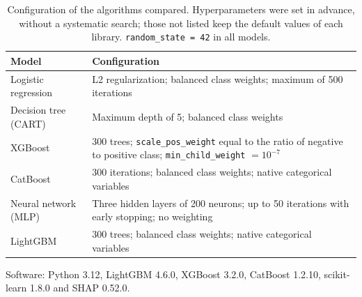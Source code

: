 \documentclass[11pt]{article}
\begin{document}
\begin{table}[h]
\caption{Configuration of the algorithms compared. Hyperparameters were set in advance, without a systematic search;
those not listed keep the default values of each library. \texttt{random\_state = 42} in all models.}
\small
\begin{tabularx}{\linewidth}{@{}p{3.4cm}L@{}}
\toprule
Model & Configuration \\
\midrule
Logistic regression & L2 regularization; balanced class weights; maximum of 500 iterations \\
Decision tree (CART) & Maximum depth of 5; balanced class weights \\
XGBoost & 300 trees; \texttt{scale\_pos\_weight} equal to the ratio of negative to positive class;
\texttt{min\_child\_weight} $= 10^{-7}$ \\
CatBoost & 300 iterations; balanced class weights; native categorical variables \\
Neural network (MLP) & Three hidden layers of 200 neurons; up to 50 iterations with early stopping; no weighting \\
LightGBM & 300 trees; balanced class weights; native categorical variables \\
\bottomrule
\end{tabularx}

\vspace{3pt}
{\footnotesize Software: Python 3.12, LightGBM 4.6.0, XGBoost 3.2.0, CatBoost 1.2.10, scikit-learn 1.8.0 and SHAP 0.52.0.}
\end{table}
\end{document}
